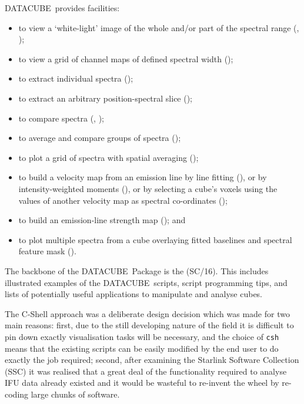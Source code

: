 \documentclass[twoside,11pt,nolof]{starlink}
\providecommand{\DATACUBE}{{\footnotesize DATACUBE}\normalsize}
\begin{document}
\DATACUBE\ provides facilities:
\begin{itemize}
\item to view a `white-light' image of the whole and/or part of the
      spectral range (,
      );
\item to view a grid of channel maps of defined spectral width
      ();
\item to extract individual spectra ();
\item to extract an arbitrary position-spectral slice
      ();
\item to compare spectra (,
      );
\item to average and compare groups of spectra
      ();
\item to plot a grid of spectra with spatial averaging
      ();
\item to build a velocity map from an emission line by line
      fitting (), or by intensity-weighted
      moments (), or by selecting
      a cube's voxels using the values of another velocity map
      as spectral co-ordinates ();
\item to build an emission-line strength map
      (); and
\item to plot multiple spectra from a cube overlaying fitted baselines
      and spectral feature mask ().
\end{itemize}

The backbone of the \DATACUBE\ Package is the  (SC/16).  This includes illustrated examples of the
\DATACUBE\ scripts, script programming tips, and lists of potentially
useful applications to manipulate and analyse cubes.

The C-Shell approach was a deliberate design decision which was made
for two main reasons: first, due to the still developing nature of
the field it is difficult to pin down exactly visualisation tasks will
be necessary, and the choice of \texttt{csh} means that the existing
scripts can be easily modified by the end user to do exactly the job
required; second, after examining the Starlink Software Collection
(SSC) it was realised that a great deal of the functionality required
to analyse IFU data already existed and it would be wasteful to
re-invent the wheel by re-coding large chunks of software.
\end{document}
